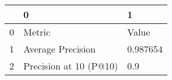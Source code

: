 \begin{tabular}{lll}
    \toprule
    {} &                       0 &         1 \\
    \midrule
    0 &                  Metric &     Value \\
    1 &       Average Precision &  0.987654 \\
    2 &  Precision at 10 (P@10) &       0.9 \\
    \bottomrule
    \end{tabular}
    